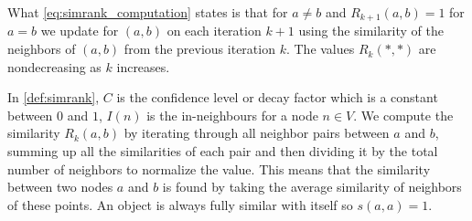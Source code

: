 What \autoref{eq:simrank_computation} states is that for $a \neq b$ and $R_{k+1}(a,b) = 1$ for $a = b$ we update for $(a,b)$ on each iteration $k+1$ using the similarity of the neighbors of $(a,b)$ from the previous iteration $k$. The values $R_k(*,*)$ are nondecreasing as $k$ increases.

In \autoref{def:simrank}, $C$ is the confidence level or decay factor which is a constant between $0$ and $1$, $I(n)$ is the in-neighbours for a node $n \in V$.
We compute the similarity $R_k(a,b)$ by iterating through all neighbor pairs between $a$ and $b$, summing up all the similarities of each pair and then dividing it by the total number of neighbors to normalize the value.
This means that the similarity between two nodes $a$ and $b$ is found by taking the average similarity of neighbors of these points. An object is always fully similar with itself so $s(a,a) = 1$.

